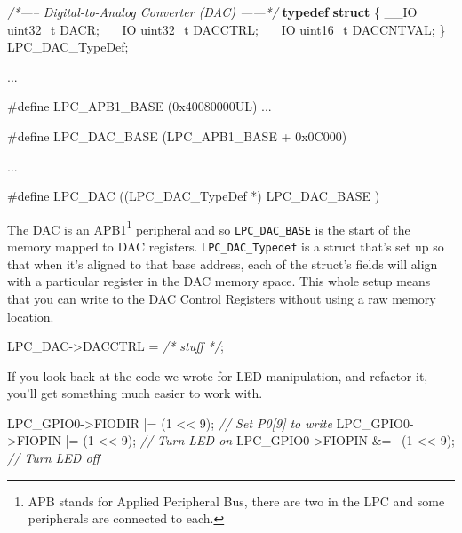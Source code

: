 \documentclass[]{article}
\newenvironment{Shaded}{\begin{snugshade}}{\end{snugshade}}
\newcommand{\KeywordTok}[1]{\textcolor[rgb]{0.13,0.29,0.53}{\textbf{{#1}}}}
\newcommand{\DataTypeTok}[1]{\textcolor[rgb]{0.13,0.29,0.53}{{#1}}}
\newcommand{\DecValTok}[1]{\textcolor[rgb]{0.00,0.00,0.81}{{#1}}}
\newcommand{\CommentTok}[1]{\textcolor[rgb]{0.56,0.35,0.01}{\textit{{#1}}}}
\newcommand{\OtherTok}[1]{\textcolor[rgb]{0.56,0.35,0.01}{{#1}}}
\newcommand{\NormalTok}[1]{{#1}}
\begin{document}
\begin{Shaded}
\begin{Highlighting}[]
    \CommentTok{/*----- Digital-to-Analog Converter (DAC) ------*/}
    \KeywordTok{typedef} \KeywordTok{struct}
    \NormalTok{\{}
        \NormalTok{__IO }\DataTypeTok{uint32_t} \NormalTok{DACR;}
        \NormalTok{__IO }\DataTypeTok{uint32_t} \NormalTok{DACCTRL;}
        \NormalTok{__IO }\DataTypeTok{uint16_t} \NormalTok{DACCNTVAL;}
    \NormalTok{\} LPC_DAC_TypeDef;}

        \NormalTok{...}

    \OtherTok{#define LPC_APB1_BASE (0x40080000UL)}
        \NormalTok{...}

    \OtherTok{#define LPC_DAC_BASE  (LPC_APB1_BASE + 0x0C000)}

        \NormalTok{...}

    \OtherTok{#define LPC_DAC       ((LPC_DAC_TypeDef *) LPC_DAC_BASE )}
\end{Highlighting}
\end{Shaded}

The DAC is an APB1\footnote{APB stands for Applied Peripheral Bus, there
  are two in the LPC and some peripherals are connected to each.}
peripheral and so \texttt{LPC\_DAC\_BASE} is the start of the memory
mapped to DAC registers. \texttt{LPC\_DAC\_Typedef} is a struct that's
set up so that when it's aligned to that base address, each of the
struct's fields will align with a particular register in the DAC memory
space. This whole setup means that you can write to the DAC Control
Registers without using a raw memory location.

\begin{Shaded}
\begin{Highlighting}[]
    \NormalTok{LPC_DAC->DACCTRL = }\CommentTok{/* stuff */}\NormalTok{;}
\end{Highlighting}
\end{Shaded}

If you look back at the code we wrote for LED manipulation, and refactor
it, you'll get something much easier to work with.

\begin{Shaded}
\begin{Highlighting}[]
    \NormalTok{LPC_GPIO0->FIODIR |= (}\DecValTok{1} \NormalTok{<< }\DecValTok{9}\NormalTok{);  }\CommentTok{// Set P0[9] to write}
    \NormalTok{LPC_GPIO0->FIOPIN |= (}\DecValTok{1} \NormalTok{<< }\DecValTok{9}\NormalTok{);  }\CommentTok{// Turn LED on}
    \NormalTok{LPC_GPIO0->FIOPIN &= ~(}\DecValTok{1} \NormalTok{<< }\DecValTok{9}\NormalTok{); }\CommentTok{// Turn LED off}
\end{Highlighting}
\end{Shaded}
\end{document}
